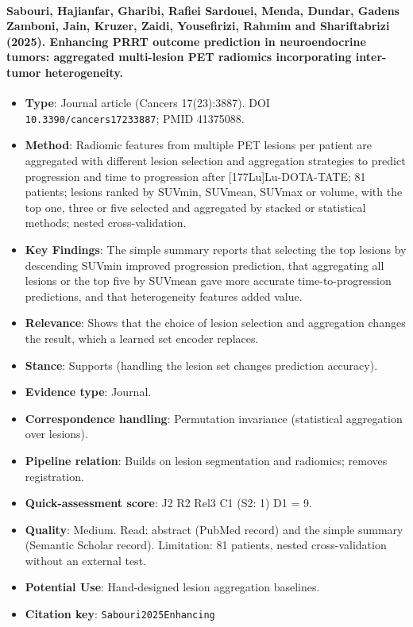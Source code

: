 \documentclass[journal,onecolumn]{IEEEtran}
\begin{document}
\paragraph{Sabouri, Hajianfar, Gharibi, Rafiei Sardouei, Menda, Dundar, Gadens Zamboni, Jain, Kruzer, Zaidi, Yousefirizi, Rahmim and Shariftabrizi (2025). Enhancing PRRT outcome prediction in neuroendocrine tumors: aggregated multi-lesion PET radiomics incorporating inter-tumor heterogeneity.~\cite{Sabouri2025Enhancing}}\mbox{}

\begin{itemize}

\item{} \textbf{Type}: Journal article (Cancers 17(23):3887). DOI \nolinkurl{10.3390/cancers17233887}; PMID 41375088.

\item{} \textbf{Method}: Radiomic features from multiple PET lesions per patient are aggregated with different lesion selection and aggregation strategies to predict progression and time to progression after [177Lu]Lu-DOTA-TATE; 81 patients; lesions ranked by SUVmin, SUVmean, SUVmax or volume, with the top one, three or five selected and aggregated by stacked or statistical methods; nested cross-validation.

\item{} \textbf{Key Findings}: The simple summary reports that selecting the top lesions by descending SUVmin improved progression prediction, that aggregating all lesions or the top five by SUVmean gave more accurate time-to-progression predictions, and that heterogeneity features added value.

\item{} \textbf{Relevance}: Shows that the choice of lesion selection and aggregation changes the result, which a learned set encoder replaces.

\item{} \textbf{Stance}: Supports (handling the lesion set changes prediction accuracy).

\item{} \textbf{Evidence type}: Journal.

\item{} \textbf{Correspondence handling}: Permutation invariance (statistical aggregation over lesions).

\item{} \textbf{Pipeline relation}: Builds on lesion segmentation and radiomics; removes registration.

\item{} \textbf{Quick-assessment score}: J2 R2 Rel3 C1 (S2: 1) D1 = 9.

\item{} \textbf{Quality}: Medium. Read: abstract (PubMed record) and the simple summary (Semantic Scholar record). Limitation: 81 patients, nested cross-validation without an external test.

\item{} \textbf{Potential Use}: Hand-designed lesion aggregation baselines.

\item{} \textbf{Citation key}: \texttt{Sabouri2025Enhancing}

\end{itemize}
\end{document}
